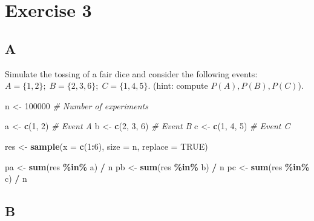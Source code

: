 \documentclass[
]{article}
\newenvironment{Shaded}{\begin{snugshade}}{\end{snugshade}}
\newcommand{\AttributeTok}[1]{\textcolor[rgb]{0.13,0.29,0.53}{#1}}
\newcommand{\CommentTok}[1]{\textcolor[rgb]{0.56,0.35,0.01}{\textit{#1}}}
\newcommand{\ConstantTok}[1]{\textcolor[rgb]{0.56,0.35,0.01}{#1}}
\newcommand{\DecValTok}[1]{\textcolor[rgb]{0.00,0.00,0.81}{#1}}
\newcommand{\FunctionTok}[1]{\textcolor[rgb]{0.13,0.29,0.53}{\textbf{#1}}}
\newcommand{\NormalTok}[1]{#1}
\newcommand{\OtherTok}[1]{\textcolor[rgb]{0.56,0.35,0.01}{#1}}
\newcommand{\SpecialCharTok}[1]{\textcolor[rgb]{0.81,0.36,0.00}{\textbf{#1}}}
\begin{document}
\hypertarget{exercise-3}{%
\section{Exercise 3}\label{exercise-3}}

\hypertarget{a-2}{%
\subsection{A}\label{a-2}}

Simulate the tossing of a fair dice and consider the following events:
\(A=\{1,2\};\;B=\{2,3,6\};\;C=\{1,4,5\}\). (hint: compute
\(P(A),P(B),P(C)\)).

\begin{Shaded}
\begin{Highlighting}[]
\NormalTok{n }\OtherTok{\textless{}{-}} \DecValTok{100000} \CommentTok{\# Number of experiments}

\NormalTok{a }\OtherTok{\textless{}{-}} \FunctionTok{c}\NormalTok{(}\DecValTok{1}\NormalTok{, }\DecValTok{2}\NormalTok{) }\CommentTok{\# Event A}
\NormalTok{b }\OtherTok{\textless{}{-}} \FunctionTok{c}\NormalTok{(}\DecValTok{2}\NormalTok{, }\DecValTok{3}\NormalTok{, }\DecValTok{6}\NormalTok{) }\CommentTok{\# Event B}
\NormalTok{c }\OtherTok{\textless{}{-}} \FunctionTok{c}\NormalTok{(}\DecValTok{1}\NormalTok{, }\DecValTok{4}\NormalTok{, }\DecValTok{5}\NormalTok{) }\CommentTok{\# Event C}

\NormalTok{res }\OtherTok{\textless{}{-}} \FunctionTok{sample}\NormalTok{(}\AttributeTok{x =} \FunctionTok{c}\NormalTok{(}\DecValTok{1}\SpecialCharTok{:}\DecValTok{6}\NormalTok{), }\AttributeTok{size =}\NormalTok{ n, }\AttributeTok{replace =} \ConstantTok{TRUE}\NormalTok{)}

\NormalTok{pa }\OtherTok{\textless{}{-}} \FunctionTok{sum}\NormalTok{(res }\SpecialCharTok{\%in\%}\NormalTok{ a) }\SpecialCharTok{/}\NormalTok{ n}
\NormalTok{pb }\OtherTok{\textless{}{-}} \FunctionTok{sum}\NormalTok{(res }\SpecialCharTok{\%in\%}\NormalTok{ b) }\SpecialCharTok{/}\NormalTok{ n}
\NormalTok{pc }\OtherTok{\textless{}{-}} \FunctionTok{sum}\NormalTok{(res }\SpecialCharTok{\%in\%}\NormalTok{ c) }\SpecialCharTok{/}\NormalTok{ n}
\end{Highlighting}
\end{Shaded}

\hypertarget{b-2}{%
\subsection{B}\label{b-2}}
\end{document}
